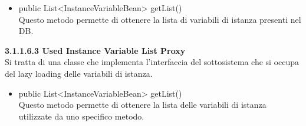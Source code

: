 \documentclass[11pt]{article}
\begin{document}
\begin{description}
				\begin{itemize}
					\item public List<InstanceVariableBean> getList() \\
					Questo metodo permette di ottenere la lista di variabili di istanza presenti nel DB.
				\end{itemize}
				
					\item \textbf{ 3.1.1.6.3  Used Instance Variable List Proxy} \\
				Si tratta di una classe che implementa l'interfaccia del sottosistema che si occupa del lazy loading delle variabili di istanza.
				
				\begin{itemize}
					\item public List<InstanceVariableBean> getList() \\
					Questo metodo permette di ottenere la lista delle variabili di istanza utilizzate da uno specifico metodo.
				\end{itemize}		
			
			
			
			\end{description}
			
			
			
\end{document}
